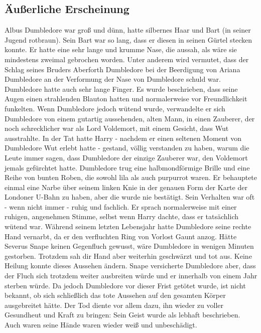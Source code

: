 \documentclass[a4paper, 10pt]{article}
\begin{document}
\subsection*{\Large Äußerliche Erscheinung}
Albus Dumbledore war groß und dünn, hatte silbernes Haar und Bart (in seiner Jugend rotbraun). Sein Bart war so lang, dass er diesen in seinen Gürtel stecken konnte. Er hatte eine sehr lange und krumme Nase, die aussah, als wäre sie mindestens zweimal gebrochen worden. Unter anderem wird vermutet, dass der Schlag seines Bruders Aberforth Dumbledore bei der Beerdigung von Ariana Dumbledore an der Verformung der Nase von Dumbledore schuld war. Dumbledore hatte auch sehr lange Finger. Es wurde beschrieben, dass seine Augen einen strahlenden Blauton hatten und normalerweise vor Freundlichkeit funkelten.
\vspace{10pt}
\newline
{}  
Wenn Dumbledore jedoch wütend wurde, verwandelte er sich Dumbledore von einem gutartig aussehenden, alten Mann, in einen Zauberer, der noch schrecklicher war als Lord Voldemort, mit einem Gesicht, dass Wut ausstrahlte. In der Tat hatte Harry - nachdem er einen seltenen Moment von Dumbledore Wut erlebt hatte - gestand, völlig verstanden zu haben, warum die Leute immer sagen, dass Dumbledore der einzige Zauberer war, den Voldemort jemals gefürchtet hatte.
\vspace{10pt}
\newline
{}  
Dumbledore trug eine halbmondförmige Brille und eine Reihe von bunten Roben, die sowohl lila als auch purpurrot waren. Er behauptete einmal eine Narbe über seinem linken Knie in der genauen Form der Karte der Londoner U-Bahn zu haben, aber die wurde nie bestätigt. Sein Verhalten war oft - wenn nicht immer - ruhig und fachlich. Er sprach normalerweise mit einer ruhigen, angenehmen Stimme, selbst wenn Harry dachte, dass er tatsächlich wütend war.
\vspace{10pt}
\newline
{}  
Während seinem letzten Lebensjahr hatte Dumbledore seine rechte Hand vernarbt, da er den verfluchten Ring von Vorlost Gaunt anzog. Hätte Severus Snape keinen Gegenfluch gewusst, wäre Dumbledore in wenigen Minuten gestorben. Trotzdem sah dir Hand aber weiterhin geschwärzt und tot aus. Keine Heilung konnte dieses Aussehen ändern. Snape versicherte Dumbledore aber, dass der Fluch sich trotzdem weiter ausbreiten würde und er innerhalb von einem Jahr sterben würde. Da jedoch Dumbledore vor dieser Frist getötet wurde, ist nicht bekannt, ob sich schließlich das tote Aussehen auf den gesamten Körper ausgebreitet hätte.
\vspace{10pt}
\newline
{}  
Der Tod diente vor allem dazu, ihn wieder zu voller Gesundheut und Kraft zu bringen: Sein Geist wurde als lebhaft beschrieben. Auch waren seine Hände waren wieder weiß und unbeschädigt.
\end{document}
